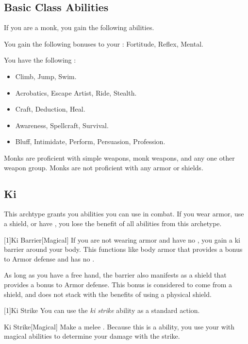     \subsection{Basic Class Abilities}
        If you are a monk, you gain the following abilities.

        You gain the following bonuses to your :  Fortitude,  Reflex,  Mental.

        You have the following :
        \begin{itemize}
            \item {} Climb, Jump, Swim.
            \item {} Acrobatics, Escape Artist, Ride, Stealth.
            \item {} Craft, Deduction, Heal.
            \item {} Awareness, Spellcraft, Survival.
            \item {} Bluff, Intimidate, Perform, Persuasion, Profession.
        \end{itemize}

        Monks are proficient with simple weapons, monk weapons, and any one other weapon group.
        Monks are not proficient with any armor or shields.

    \subsection{Ki}
        This archtype grants you abilities you can use in combat.
        If you wear armor, use a shield, or have , you lose the benefit of all abilities from this archetype.

        [1]{Ki Barrier}[Magical]
        If you are not wearing armor and have no , you gain a ki barrier around your body.
        This functions like body armor that provides a  bonus to Armor defense and has no .

        As long as you have a free hand, the barrier also manifests as a shield that provides a  bonus to Armor defense.
        This bonus is considered to come from a shield, and does not stack with the benefits of using a physical shield.

        [1]{Ki Strike} You can use the \textit{ki strike} ability as a standard action.
        \begin{freeability}{Ki Strike}[Magical]
            Make a melee .
            Because this is a  ability, you use your  with magical abilities to determine your damage with the strike.
        \end{freeability}

